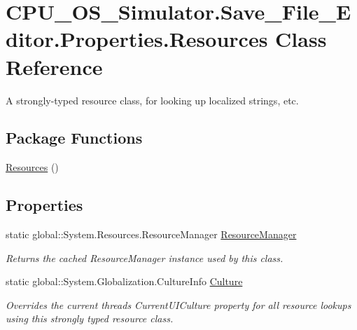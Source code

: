 \hypertarget{class_c_p_u___o_s___simulator_1_1_save___file___editor_1_1_properties_1_1_resources}{}\section{C\+P\+U\+\_\+\+O\+S\+\_\+\+Simulator.\+Save\+\_\+\+File\+\_\+\+Editor.\+Properties.\+Resources Class Reference}
\label{class_c_p_u___o_s___simulator_1_1_save___file___editor_1_1_properties_1_1_resources}


A strongly-\/typed resource class, for looking up localized strings, etc.  


\subsection*{Package Functions}
\begin{DoxyCompactItemize}
\item 
\hyperlink{class_c_p_u___o_s___simulator_1_1_save___file___editor_1_1_properties_1_1_resources_a2c5d7789b994d9d04fadd66d102de1b8}{Resources} ()
\end{DoxyCompactItemize}
\subsection*{Properties}
\begin{DoxyCompactItemize}
\item 
static global\+::\+System.\+Resources.\+Resource\+Manager \hyperlink{class_c_p_u___o_s___simulator_1_1_save___file___editor_1_1_properties_1_1_resources_a347fe7c7cfce80b52d1a40e25f8df7c0}{Resource\+Manager}
\begin{DoxyCompactList}\small\item\em Returns the cached Resource\+Manager instance used by this class. \end{DoxyCompactList}\item 
static global\+::\+System.\+Globalization.\+Culture\+Info \hyperlink{class_c_p_u___o_s___simulator_1_1_save___file___editor_1_1_properties_1_1_resources_a599c178dcb474612d6d2918b305bde9a}{Culture}
\begin{DoxyCompactList}\small\item\em Overrides the current thread\textquotesingle{}s Current\+U\+I\+Culture property for all resource lookups using this strongly typed resource class. \end{DoxyCompactList}\end{DoxyCompactItemize}
